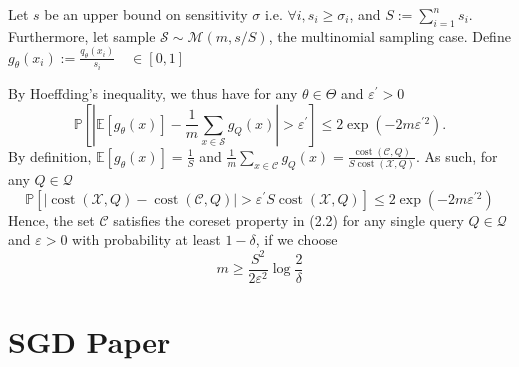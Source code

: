 \documentclass{article}
\theoremstyle{definition}
\begin{document}
Let $s$ be an upper bound on sensitivity $\sigma$ i.e. $\forall i, s_i \geq \sigma_i$, and $S := \sum_{i=1}^n s_i$. Furthermore, let sample  $\mathcal S \sim \mathcal M(m, s/S)$, the multinomial sampling case. Define $g_\theta(x_i) := \frac{q_\theta(x_i)}{s_i}  \quad \in[0,1]$

By Hoeffding's inequality, we thus have for any $\theta \in \Theta$ and $\varepsilon^{\prime}>0$
$$
\mathbb{P}\left[\left|\mathbb{E}\left[g_{\theta}(x)\right]-\frac{1}{m} \sum_{x \in \mathcal{S}} g_{Q}(x)\right|>\varepsilon^{\prime}\right] \leq 2 \exp \left(-2 m \varepsilon^{\prime 2}\right) .
$$
By definition, $\mathbb{E}\left[g_{\theta}(x)\right]=\frac{1}{S}$ and $\frac{1}{m} \sum_{x \in \mathcal{C}} g_{Q}(x)=\frac{\operatorname{cost}(\mathcal{C}, Q)}{S \operatorname{cost}(\mathcal{X}, Q)}$. As such, for any $Q \in \mathcal{Q}$
$$
\mathbb{P}\left[|\operatorname{cost}(\mathcal{X}, Q)-\operatorname{cost}(\mathcal{C}, Q)|>\varepsilon^{\prime} S \operatorname{cost}(\mathcal{X}, Q)\right] \leq 2 \exp \left(-2 m \varepsilon^{\prime 2}\right)
$$
Hence, the set $\mathcal{C}$ satisfies the coreset property in (2.2) for any single query $Q \in \mathcal{Q}$ and $\varepsilon>0$ with probability at least $1-\delta$, if we choose
$$
m \geq \frac{S^{2}}{2 \varepsilon^{2}} \log \frac{2}{\delta}
$$




\section{SGD Paper}
	


	
	\vfill
	
	
	\printbibliography
%	 
%	 
	
\end{document}
